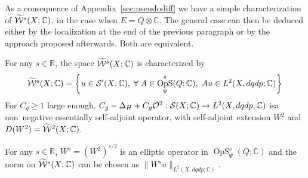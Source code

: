 \documentclass[10pt]{amsart}
\theoremstyle{definition}\newtheorem{defi}[theo]{Definition}\newtheorem{rema}[theo]{Remark}\newtheorem{exam}[theo]{Example}\newtheorem{exem}[theo]{Example}\newtheorem{nota}[theo]{Notation}
\newcommand{\C}{\mathbb{C}}
\newcommand{\R}{\mathbb{R}}
\newcommand{\clW}{\mathcal{W}}
\newcommand{\clO}{\mathcal{O}}
\newcommand{\clS}{\mathcal{S}}
\DeclareMathOperator{\OpS}{OpS}
\let\oldtilde\tilde
\renewcommand*{\tilde}[1]{\mathchoice{\widetilde{#1}}{\widetilde{#1}}{\oldtilde{#1}}{\oldtilde{#1}}}
\let\oldforall\forall
\renewcommand*{\forall}{\mathrel{\oldforall}}
\let\originalleft\left
\let\originalright\right
\renewcommand{\left}{\mathopen{}\mathclose\bgroup\originalleft}
\renewcommand{\right}{\aftergroup\egroup\originalright}
\renewcommand*{\to}{\mathchoice{\longrightarrow}{\rightarrow}{\rightarrow}{\rightarrow}}
\begin{document}
As a consequence of Appendix~\ref{sec:pseudodiff} we have a simple characterization of $\tilde{\clW}^{s}(X;\C)$, in the case when $E=Q\otimes \C$. The general case can then be deduced either by the localization at the end of the previous paragraph or by the approach proposed afterwards. Both are equivalent.
\begin{prop}\label{pr:characWs}
For any $s\in \R$, the space $\tilde{\clW}^{s}(X;\C)$ is characterized by
\[
\tilde{\clW}^{s}(X;\C)=\left\{u\in \clS'(X;\C),\; \forall A\in \OpS^{s}_{\Psi}(Q;\C),\; Au\in L^{2}(X,dqdp;\C)\right\}
\]
For $C_{g}\geq 1$ large enough, $C_{g}-\Delta_{H}+C_{g}\clO^{2}:\clS(X;\C)\to L^{2}(X,dqdp;\C)$ is\linebreak a non~negative essentially self-adjoint operator, with self-adjoint extension $W^{2}$ and $D(W^{2})=\tilde{\clW}^{2}(X;\C)$.

For any $s\in \R$, $W^{s}=(W^{2})^{s/2}$ is an elliptic operator in $\OpS^{s}_{\Psi}(Q;\C)$ and the norm on $\tilde{\clW}^{s}(X;\C)$ can be chosen as $\|W^{s}u\|_{L^{2}(X,dqdp;\C)}$.
\end{prop}
\end{document}

